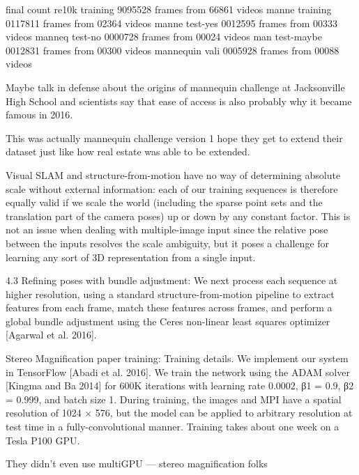 final count 
re10k training 9095528 frames from 66861 videos 
manne training 0117811 frames from 02364 videos
manne test-yes 0012595 frames from 00333 videos
manneq test-no 0000728 frames from 00024 videos
man test-maybe 0012831 frames from 00300 videos
mannequin vali 0005928 frames from 00088 videos

Maybe talk in defense about the origins of mannequin challenge at Jacksonville High School and scientists say that ease of access is also probably why it became famous in 2016.

This was actually mannequin challenge version 1 hope they get to extend their dataset just like how real estate was able to be extended.

Visual SLAM and structure-from-motion have no way of determining absolute scale without external information: each of our training sequences is therefore equally valid if we scale the world (including the sparse point sets and the translation part of the camera poses) up or down by any constant factor. This is not an issue when dealing with multiple-image input since the relative pose between the inputs resolves the scale ambiguity, but it poses a challenge for learning any sort of 3D representation from a single input.

4.3 Refining poses with bundle adjustment: 
We next process each sequence at higher resolution, using a standard structure-from-motion pipeline to extract features from each frame, match these features across frames, and perform a global bundle adjustment using the Ceres non-linear least squares optimizer [Agarwal et al. 2016].

Stereo Magnification paper training:
Training details. We implement our system in TensorFlow [Abadi et al. 2016]. We train the network using the ADAM solver [Kingma and Ba 2014] for 600K iterations with learning rate 0.0002, β1 = 0.9, β2 = 0.999, and batch size 1. During training, the images and MPI have a spatial resolution of 1024 × 576, but the model can be applied to arbitrary resolution at test time in a fully-convolutional manner. Training takes about one week on a Tesla P100 GPU.

They didn't even use multiGPU — stereo magnification folks